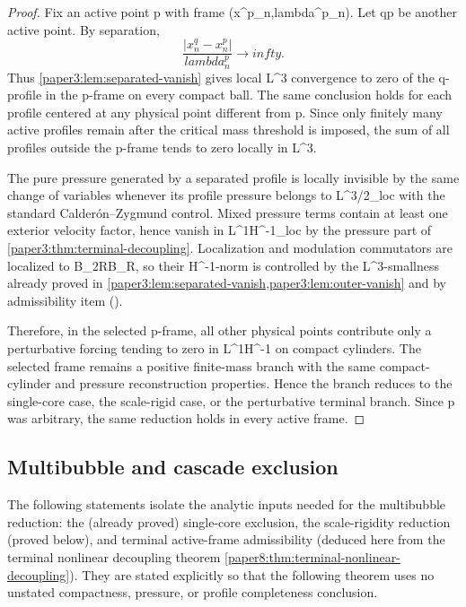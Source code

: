 \documentclass[11pt]{amsart}
\def\({}%
\def\){}%
\def\mathrm#1{#1}%
\def\lambda{lambda}%
\def\infty{infty}%
\theoremstyle{plain}
\theoremstyle{definition}
\theoremstyle{remark}
\begin{document}
\begin{proof}
Fix an active point \(p\) with frame \((x^p_n,\lambda^p_n)\).  Let \(q\ne p\)
be another active point.  By separation,
\[
  \frac{|x^q_n-x^p_n|}{\lambda^p_n}\to\infty.
\]
Thus \cref{paper3:lem:separated-vanish} gives local \(L^3\) convergence to zero of the
\(q\)-profile in the \(p\)-frame on every compact ball.  The same conclusion
holds for each profile centered at any physical point different from \(p\).
Since only finitely many active profiles remain after the critical mass
threshold is imposed, the sum of all profiles outside the \(p\)-frame tends to
zero locally in \(L^3\).

The pure pressure generated by a separated profile is locally invisible by the
same change of variables whenever its profile pressure belongs to
\(L^{3/2}_{\mathrm{loc}}\) with the standard Calder\'on--Zygmund control.  Mixed
pressure terms contain at least one exterior velocity factor, hence vanish in
\(L^1H^{-1}_{\mathrm{loc}}\) by the pressure part of
\cref{paper3:thm:terminal-decoupling}.  Localization and modulation commutators are
localized to \(B_{2R}\setminus B_R\), so their \(H^{-1}\)-norm is controlled by
the \(L^3\)-smallness already proved in \cref{paper3:lem:separated-vanish,paper3:lem:outer-vanish}
and by admissibility item \(()\).

Therefore, in the selected \(p\)-frame, all other physical points contribute
only a perturbative forcing tending to zero in \(L^1H^{-1}\) on compact
cylinders.  The selected frame remains a positive finite-mass branch with the
same compact-cylinder and pressure reconstruction properties.  Hence the branch
reduces to the single-core case, the scale-rigid case, or the perturbative
terminal branch.  Since \(p\) was arbitrary, the same reduction holds in every
active frame.
\end{proof}

\subsection{Multibubble and cascade exclusion}

The following statements isolate the analytic inputs needed for the
multibubble reduction: the (already proved) single-core exclusion, the
scale-rigidity reduction (proved below), and terminal active-frame
admissibility (deduced here from the terminal nonlinear decoupling theorem
\cref{paper8:thm:terminal-nonlinear-decoupling}).  They are stated
explicitly so that the following theorem uses no unstated compactness,
pressure, or profile completeness conclusion.
\end{document}
